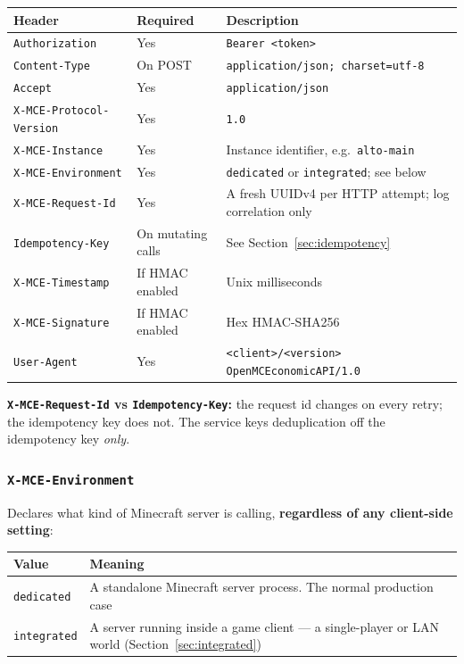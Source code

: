 \documentclass[11pt,a4paper]{article}
\newcommand{\code}[1]{\texttt{\small #1}}
\newcommand{\keybox}[2]{%
  \par\vspace{0.5em}\noindent
  \colorbox{#1}{%
    \begin{minipage}{\dimexpr\linewidth-2\fboxsep\relax}
    \vspace{0.35em}\small #2\vspace{0.35em}
    \end{minipage}}%
  \par\vspace{0.5em}}
\newcommand{\note}[1]{\keybox{omceWash}{#1}}
\begin{document}
\begin{tabularx}{\linewidth}{L{5.0cm} L{1.9cm} X}
\toprule
\textbf{Header} & \textbf{Required} & \textbf{Description}\\
\midrule
\code{Authorization}           & Yes        & \code{Bearer <token>}\\
\code{Content-Type}            & On POST    & \code{application/json; charset=utf-8}\\
\code{Accept}                  & Yes        & \code{application/json}\\
\code{X-MCE-Protocol-Version}  & Yes        & \code{1.0}\\
\code{X-MCE-Instance}          & Yes        & Instance identifier, e.g.\ \code{alto-main}\\
\code{X-MCE-Environment}       & Yes        & \code{dedicated} or \code{integrated}; see below\\
\code{X-MCE-Request-Id}        & Yes        & A fresh UUIDv4 per HTTP attempt; log correlation only\\
\code{Idempotency-Key}         & On mutating calls & See Section~\ref{sec:idempotency}\\
\code{X-MCE-Timestamp}         & If HMAC enabled & Unix milliseconds\\
\code{X-MCE-Signature}         & If HMAC enabled & Hex HMAC-SHA256\\
\code{User-Agent}              & Yes        & \code{<client>/<version> OpenMCEconomicAPI/1.0}\\
\bottomrule
\end{tabularx}

\note{\textbf{\code{X-MCE-Request-Id} vs \code{Idempotency-Key}:} the request id changes on every
retry; the idempotency key does not. The service keys deduplication off the idempotency key
\emph{only}.}

\subsubsection*{\code{X-MCE-Environment}}

Declares what kind of Minecraft server is calling, \textbf{regardless of any client-side setting}:

\begin{tabularx}{\linewidth}{L{3.0cm} X}
\toprule
\textbf{Value} & \textbf{Meaning}\\
\midrule
\code{dedicated}  & A standalone Minecraft server process. The normal production case\\
\code{integrated} & A server running inside a game client --- a single-player or LAN world
                    (Section~\ref{sec:integrated})\\
\bottomrule
\end{tabularx}
\end{document}
